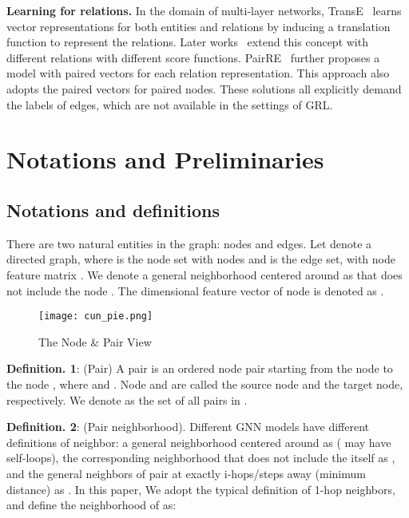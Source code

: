 \documentclass[10pt,journal,compsoc]{IEEEtran}
\begin{document}
\noindent\textbf{Learning for relations.} In the domain of multi-layer networks, TransE~\cite{TransE13} learns vector representations for both entities and relations by inducing a translation function to represent the relations. Later works~\cite{TransR15,Rotate19} extend this concept with different relations with different score functions. PairRE~\cite{PairRE} further proposes a model with paired vectors for each relation representation. This approach also adopts the paired vectors for paired nodes. These solutions all explicitly demand the labels of edges, which are not available in the settings of GRL.







\section{Notations and Preliminaries}

\subsection{Notations and definitions}

There are two natural entities in the graph: nodes and edges. Let  denote a directed graph, where  is the node set with  nodes and  is the edge set, with node feature matrix . We denote a general neighborhood centered around  as  that does not include the node . The  dimensional feature vector of node  is denoted as .



\begin{wrapfigure}{r}{0.45\columnwidth}
\vspace{-0.25in}
\centering
\texttt{[image: cun\_pie.png]}
\caption{The Node \& Pair View}
\label{fig:nodepair}
\vspace{-0.2in}
\end{wrapfigure}






\noindent \textbf{Definition. 1}: (Pair) A pair is an ordered node pair  starting from the node  to the node , where  and . Node  and  are called the source node and the target node, respectively. We denote  as the set of all pairs in .

\noindent \textbf{Definition. 2}: (Pair neighborhood). Different GNN models have different definitions of neighbor: a general neighborhood centered around  as  ( may have self-loops), the corresponding neighborhood that does not include the  itself as , and the general neighbors of pair  at exactly i-hops/steps away (minimum distance) as . In this paper, We adopt the typical definition of 1-hop neighbors, and define the neighborhood of  as:
\end{document}
